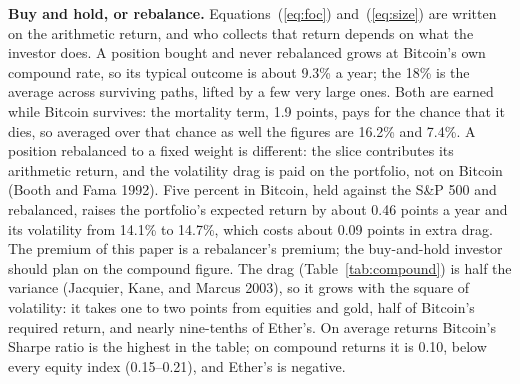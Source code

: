 \documentclass[11pt]{article}
\begin{document}
\textbf{Buy and hold, or rebalance.} Equations~(\ref{eq:foc}) and~(\ref{eq:size}) are written on the arithmetic return, and who collects that return depends on what the investor does. A position bought and never rebalanced grows at Bitcoin's own compound rate, so its typical outcome is about 9.3\% a year; the 18\% is the average across surviving paths, lifted by a few very large ones. Both are earned while Bitcoin survives: the mortality term, 1.9 points, pays for the chance that it dies, so averaged over that chance as well the figures are 16.2\% and 7.4\%. A position rebalanced to a fixed weight is different: the slice contributes its arithmetic return, and the volatility drag is paid on the portfolio, not on Bitcoin (Booth and Fama 1992). Five percent in Bitcoin, held against the S\&P 500 and rebalanced, raises the portfolio's expected return by about 0.46 points a year and its volatility from 14.1\% to 14.7\%, which costs about 0.09 points in extra drag. The premium of this paper is a rebalancer's premium; the buy-and-hold investor should plan on the compound figure. The drag (Table~\ref{tab:compound}) is half the variance (Jacquier, Kane, and Marcus 2003), so it grows with the square of volatility: it takes one to two points from equities and gold, half of Bitcoin's required return, and nearly nine-tenths of Ether's. On average returns Bitcoin's Sharpe ratio is the highest in the table; on compound returns it is 0.10, below every equity index (0.15--0.21), and Ether's is negative.
\end{document}
